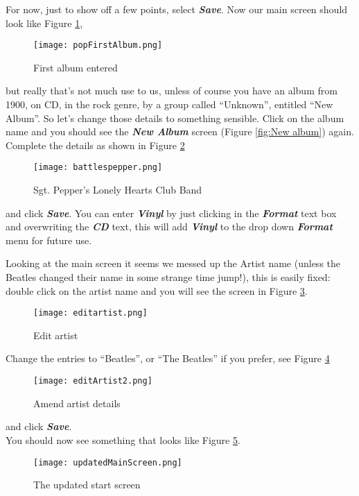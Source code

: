 \newpage 
For now, just to show off a few points, select
\textbf{\textit{Save}}.
Now our main screen should look like Figure
\ref{fig:First album entered},
\begin{figure}[!ht]
 \texttt{[image: popFirstAlbum.png]} 
 \caption{First album entered}
 \label{fig:First album entered}
\end{figure}
but really that's not much use to us, unless of course you have an album from 1900, on CD, in the rock genre, by a group called ``Unknown'', entitled ``New Album''.  So let's change those details to something sensible. Click on the album name and you should see the
\textit{\textbf{New Album}}
screen (Figure 
\ref{fig:New album})
again.  Complete the details as shown in Figure
\ref{fig:Sgt. Pepper's Lonely Hearts Club Band}
\begin{figure}[!ht]
 \texttt{[image: battlespepper.png]}
 \caption{Sgt. Pepper's Lonely Hearts Club Band}
 \label{fig:Sgt. Pepper's Lonely Hearts Club Band}
\end{figure}
and click 
\textbf{\textit{Save}}.
You can enter
\textbf{\textit{Vinyl}}
by just clicking in the
\textbf{\textit{Format}}
text box and overwriting the
\textbf{\textit{CD}}
text, this will add
\textbf{\textit{Vinyl}}
to the drop down 
\textbf{\textit{Format}}
menu for future use.

Looking at the main screen it seems we messed up the Artist name (unless the Beatles changed their name in some strange time jump!), this is easily fixed: double click on the artist name and you will see the screen in Figure
\ref{fig:Edit artist}.
\begin{figure}[!ht]
 \texttt{[image: editartist.png]}
 \caption{Edit artist}
 \label{fig:Edit artist}
\end{figure} 
\newpage
Change the entries to ``Beatles'', or ``The Beatles'' if you prefer, see Figure
\ref{fig:Corrected artist}
\begin{figure}[!ht]
 \texttt{[image: editArtist2.png]}
 \caption{Amend artist details}
 \label{fig:Corrected artist}
\end{figure} 
and click 
\textbf{\textit{Save}}.
\\You should now see something that looks like Figure
\ref{fig:Updated start screen}.
\begin{figure}[!ht]
 \texttt{[image: updatedMainScreen.png]}
 \caption{The updated start screen}
 \label{fig:Updated start screen}
\end{figure} 


